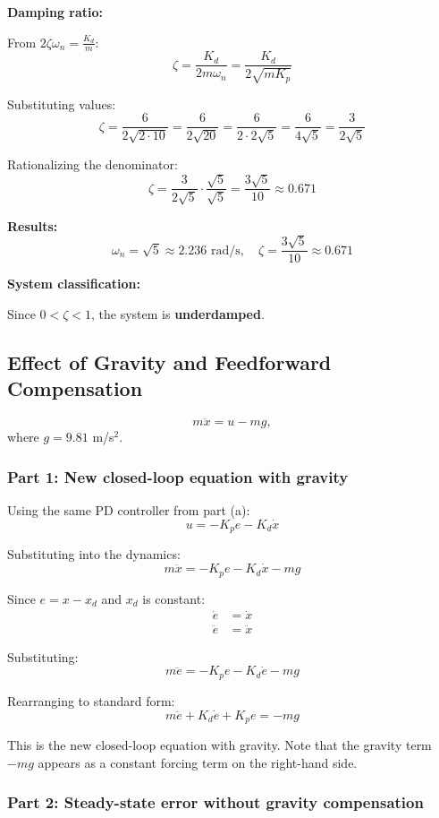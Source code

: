 \documentclass[11pt]{article}
\begin{document}
\textbf{Damping ratio:}

From $2\zeta\omega_n = \frac{K_d}{m}$:
\[
\zeta = \frac{K_d}{2m\omega_n} = \frac{K_d}{2\sqrt{mK_p}}
\]

Substituting values:
\[
\zeta = \frac{6}{2\sqrt{2 \cdot 10}} = \frac{6}{2\sqrt{20}} = \frac{6}{2 \cdot 2\sqrt{5}} = \frac{6}{4\sqrt{5}} = \frac{3}{2\sqrt{5}}
\]

Rationalizing the denominator:
\[
\zeta = \frac{3}{2\sqrt{5}} \cdot \frac{\sqrt{5}}{\sqrt{5}} = \frac{3\sqrt{5}}{10} \approx 0.671
\]

\textbf{Results:}
\[
\boxed{\omega_n = \sqrt{5} \approx 2.236 \text{ rad/s}, \quad \zeta = \frac{3\sqrt{5}}{10} \approx 0.671}
\]

\textbf{System classification:}

Since $0 < \zeta < 1$, the system is \textbf{underdamped}.

\subsection{Effect of Gravity and Feedforward Compensation}

\[
m\ddot{x} = u - mg,
\]
where $g = 9.81$ m/s$^2$.

\subsubsection*{Part 1: New closed-loop equation with gravity}

Using the same PD controller from part (a):
\[
u = -K_p e - K_d \dot{x}
\]

Substituting into the dynamics:
\[
m\ddot{x} = -K_p e - K_d \dot{x} - mg
\]

Since $e = x - x_d$ and $x_d$ is constant:
\begin{align*}
\dot{e} &= \dot{x} \\
\ddot{e} &= \ddot{x}
\end{align*}

Substituting:
\[
m\ddot{e} = -K_p e - K_d \dot{e} - mg
\]

Rearranging to standard form:
\[
\boxed{m\ddot{e} + K_d \dot{e} + K_p e = -mg}
\]

This is the new closed-loop equation with gravity. Note that the gravity term $-mg$ appears as a constant forcing term on the right-hand side.

\subsubsection*{Part 2: Steady-state error without gravity compensation}
\end{document}
